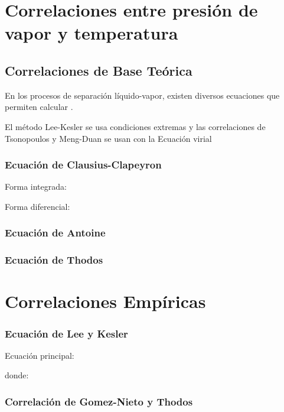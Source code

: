 
\section{Correlaciones entre presión de vapor y temperatura}
\subsection{Correlaciones de Base Teórica}
    En los procesos de separación líquido-vapor, existen diversos ecuaciones que permiten calcular \parencite[p. 355]{bib:rodriguez2010termodinamica}.

    El método Lee-Kesler se usa condiciones extremas y las correlaciones de Tsonopoulos y Meng-Duan se usan con la Ecuación virial


    \subsubsection{Ecuación de Clausius-Clapeyron}

    Forma integrada:
    \eqClausiusClapeyron

    Forma diferencial:
    \eqClausiusClapeyronDiff

    \subsubsection{Ecuación de Antoine}
    \eqAntoine


    \subsubsection{Ecuación de Thodos}
        \eqThodos


    \section{Correlaciones Empíricas}


    \subsubsection{Ecuación de Lee y Kesler}

    Ecuación principal:
    \eqLeeKesler


    donde:
    \eqLeeKeslerFZero


    \eqLeeKeslerFOne


    \subsubsection{Correlación de Gomez-Nieto y Thodos}
    \eqGomezNieto



